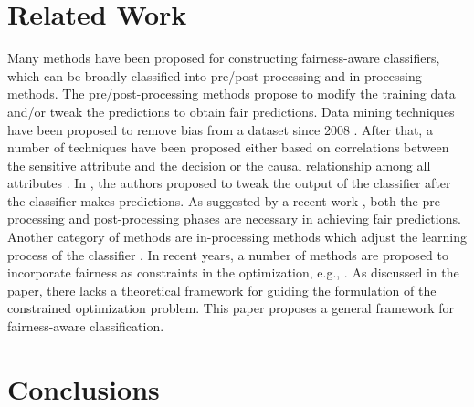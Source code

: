 \documentclass[letterpaper]{article} %
\begin{document}
\section{Related Work}\label{sec:r}



Many methods have been proposed for constructing fairness-aware classifiers, which can be broadly classified into pre/post-processing and in-processing methods. The pre/post-processing methods propose to modify the training data and/or tweak the predictions to obtain fair predictions. Data mining techniques have been proposed to remove bias from a dataset since 2008 \cite{Pedreshi2008}. After that, a number of techniques have been proposed either based on correlations between the sensitive attribute and the decision \cite{Dwork2012,Feldman2015,Wu2016,Zliobaite2011} or the causal relationship among all attributes \cite{Kilbertus2017,Zhang2017,Zhang2017a,Zhang2017b}. In \cite{Hardt2016}, the authors proposed to tweak the output of the classifier after the classifier makes predictions. As suggested by a recent work \cite{zhang2018achieving}, both the pre-processing and post-processing phases are necessary in achieving fair predictions.
Another category of methods are in-processing methods which adjust the learning process of the classifier \cite{Kamishima2011a,agarwal2017reductions,menon2018cost}. In recent years, a number of methods are proposed to incorporate fairness as constraints in the optimization, e.g., \cite{Kamishima2011a,Goh,Krishna2018,Zafar2017b,Zafar2017a,woodworth2017learning,olfat2018spectral}. As discussed in the paper, there lacks a theoretical framework for guiding the formulation of the constrained optimization problem. This paper proposes a general framework for fairness-aware classification.

\section{Conclusions}\label{sec:c}
\end{document}
